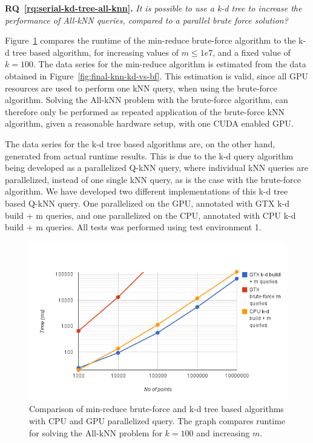 \textbf{RQ~\ref{rq:serial-kd-tree-all-knn}.} \emph{It is possible to use a k-d tree to increase the performance of All-kNN queries, compared to a parallel brute force solution?}

Figure~\ref{fig:final-all-knn-gpu-vs-cpu-vs-bf} compares the runtime of the min-reduce brute-force algorithm to the k-d tree based algorithm, for increasing values of $m\le1e7$, and a fixed value of $k=100$. The data series for the min-reduce algorithm is estimated from the data obtained in Figure~\ref{fig:final-knn-kd-vs-bf}. This estimation is valid, since all GPU resources are used to perform one kNN query, when using the brute-force algorithm. Solving the All-kNN problem with the brute-force algorithm, can therefore only be performed as repeated application of the brute-force kNN algorithm, given a reasonable hardware setup, with one CUDA enabled GPU.

The data series for the k-d tree based algorithms are, on the other hand, generated from actual runtime results. This is due to the k-d query algorithm being developed as a parallelized Q-kNN query, where individual kNN queries are parallelized, instead of one single kNN query, as is the case with the brute-force algorithm. We have developed two different implementations of this k-d tree based Q-kNN query. One parallelized on the GPU, annotated with GTX k-d build + m queries, and one parallelized on the CPU, annotated with CPU k-d build + m queries. All tests was performed using test environment 1.

\begin{figure}[ht!]
    \centering
    \includegraphics[width=120mm]{../gfx/final-all-knn-gpu-vs-cpu-vs-bf.png}
    \caption{Comparison of min-reduce brute-force and k-d tree based algorithms with CPU and GPU parallelized query. The graph compares runtime for solving the All-kNN problem for $k=100$ and increasing $m$.}
    \label{fig:final-all-knn-gpu-vs-cpu-vs-bf}
\end{figure}

